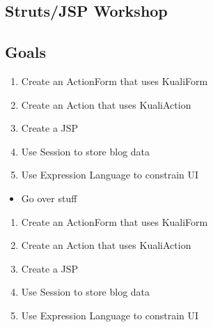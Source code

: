 \begin{ifhtml}
  \begin{s5slide}
    \section{Struts/JSP Workshop}
    \subsection{Goals}
    \begin{enumerate}
      \item Create an ActionForm that uses KualiForm
      \item Create an Action that uses KualiAction
      \item Create a JSP
      \item Use Session to store blog data
      \item Use Expression Language to constrain UI
    \end{enumerate}
  \end{s5slide}

  \begin{s5notes}
    \begin{itemize}
      \item Go over stuff
    \end{itemize}
    \begin{enumerate}
      \item Create an ActionForm that uses KualiForm
      \item Create an Action that uses KualiAction
      \item Create a JSP
      \item Use Session to store blog data
      \item Use Expression Language to constrain UI
    \end{enumerate}
  \end{s5notes}

\end{ifhtml}
